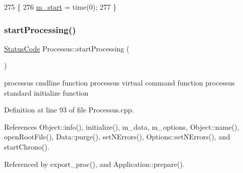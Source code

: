 \begin{DoxyCode}
275                     \{
276     \hyperlink{classProcessus_a8ec00b2e12c5beada932610f30218e93}{m\_start} = time(0);
277   \}
\end{DoxyCode}
\mbox{\label{classProcessus_a09319bde9bed93e290f69b4e04585543}} 
\subsubsection{\texorpdfstring{start\+Processing()}{startProcessing()}}
{\footnotesize\ttfamily \hyperlink{classStatusCode}{Status\+Code} Processus\+::start\+Processing (\begin{DoxyParamCaption}{ }\end{DoxyParamCaption})}

processus cmdline function processus virtual command function processus standard initialize function 

Definition at line 93 of file Processus.\+cpp.



References Object\+::info(), initialize(), m\+\_\+data, m\+\_\+options, Object\+::name(), open\+Root\+File(), Data\+::purge(), set\+N\+Errors(), Options\+::set\+N\+Errors(), and start\+Chrono().



Referenced by export\+\_\+proc(), and Application\+::prepare().


